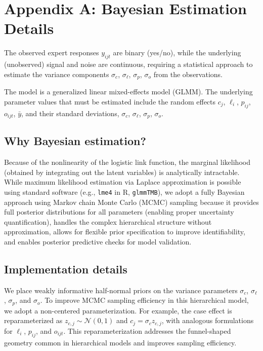 \section*{Appendix A: Bayesian Estimation Details}\label{section-estimation}

The observed expert responses $y_{ijt}$ are binary (yes/no), while the underlying (unobserved) signal and noise are continuous, requiring a statistical approach to estimate the variance components $\sigma_c$, $\sigma_\ell$, $\sigma_p$, $\sigma_o$ from the observations.

The model is a generalized linear mixed-effects model (GLMM). The underlying parameter values that must be estimated include the random effects $c_j$, $\ell_i$, $p_{ij}$, $o_{ijt}$, $\bar{y}$, and their standard deviations, $\sigma_c$, $\sigma_\ell$, $\sigma_p$, $\sigma_o$.

\subsection*{Why Bayesian estimation?}
Because of the nonlinearity of the logistic link function, the marginal likelihood (obtained by integrating out the latent variables) is analytically intractable. While maximum likelihood estimation via Laplace approximation is possible using standard software (e.g., \texttt{lme4} in R, \texttt{glmmTMB}), we adopt a fully Bayesian approach using Markov chain Monte Carlo (MCMC) sampling because it provides full posterior distributions for all parameters (enabling proper uncertainty quantification), handles the complex hierarchical structure without approximation, allows for flexible prior specification to improve identifiability, and enables posterior predictive checks for model validation.

\subsection*{Implementation details}
We place weakly informative half-normal priors on the variance parameters $\sigma_c$, $\sigma_\ell$, $\sigma_p$, and $\sigma_o$. To improve MCMC sampling efficiency in this hierarchical model, we adopt a non-centered parameterization. For example, the case effect is reparameterized as $z_{c,j} \sim \mathcal{N}(0,1)$ and $c_j = \sigma_c z_{c,j}$, with analogous formulations for $\ell_i$, $p_{ij}$, and $o_{ijt}$. This reparameterization addresses the funnel-shaped geometry common in hierarchical models and improves sampling efficiency.

